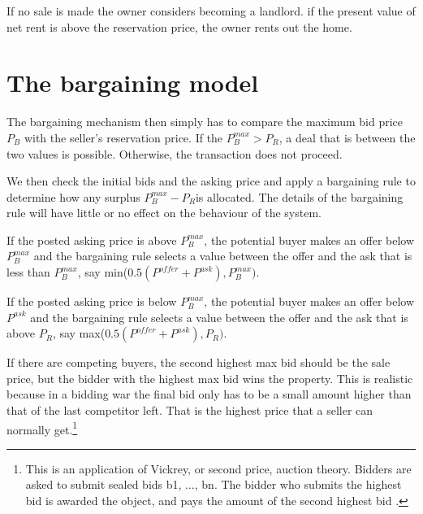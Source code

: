 If no sale is made the owner considers becoming a landlord. if the present value of net rent is above the reservation price, the owner rents out the home. 


\section{The bargaining model} \label{section-bargaining}
The bargaining  mechanism then simply has to compare the maximum bid price  $P_B$ with the seller's reservation price. If the $P_B^{max}>P_R$, a deal that is between the two values is possible. Otherwise, the transaction does not proceed.

We then check the initial bids and the asking price and apply a bargaining rule to determine how any surplus $P_B^{max}-P_R$is allocated. The details of the bargaining rule will have little or no effect on the  behaviour of the system. 

If the posted asking price is above $P_B^{max}$, the potential buyer  makes an offer below $P_B^{max}$ and the bargaining rule selects a value between the offer and the ask that is less than $P_B^{max}$, say min($0.5(P^{offer}+P^{ask}), P_B^{max})$.

If the posted asking price is below $P_B^{max}$, the potential buyer  makes an offer below $P^{ask}$ and the bargaining rule selects a value between the offer and the ask that is above $P_R$, say max($0.5(P^{offer}+P^{ask}), P_R)$. 

If there  are competing buyers, the second highest max bid should be the sale price, but the bidder with the highest max bid wins the property. This is realistic because in a bidding war the final bid only has to be a small amount higher than that of the last competitor left.  That is the highest price that a seller can normally get.\footnote{This is an application of Vickrey, or second price, auction theory. Bidders are asked to submit sealed bids b1, ..., bn. The bidder who submits the highest bid is awarded the object, and pays the amount of the second highest bid \cite{levinAuctionTheory2004}.}

 







